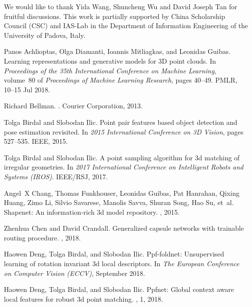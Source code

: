 \documentclass[10pt,twocolumn,letterpaper]{article}
\theoremstyle{break}
\begin{document}
We would like to thank Yida Wang, Shuncheng Wu and David Joseph Tan for fruitful discussions. This work is partially supported by China Scholarship Council (CSC) and IAS-Lab in the Department of Information Engineering of the University of Padova, Italy. {\small
\begin{thebibliography}{10}\itemsep=-1pt

Panos Achlioptas, Olga Diamanti, Ioannis Mitliagkas, and Leonidas Guibas.
\newblock Learning representations and generative models for 3{D} point clouds.
\newblock In {\em Proceedings of the 35th International Conference on Machine
  Learning}, volume~80 of {\em Proceedings of Machine Learning Research}, pages
  40--49. PMLR, 10--15 Jul 2018.

Richard Bellman.
.
\newblock Courier Corporation, 2013.

Tolga Birdal and Slobodan Ilic.
\newblock Point pair features based object detection and pose estimation
  revisited.
\newblock In {\em 2015 International Conference on 3D Vision}, pages 527--535.
  IEEE, 2015.

Tolga Birdal and Slobodan Ilic.
\newblock A point sampling algorithm for 3d matching of irregular geometries.
\newblock In {\em 2017 International Conference on Intelligent Robots and
  Systems (IROS)}. IEEE/RSJ, 2017.

Angel~X Chang, Thomas Funkhouser, Leonidas Guibas, Pat Hanrahan, Qixing Huang,
  Zimo Li, Silvio Savarese, Manolis Savva, Shuran Song, Hao Su, et~al.
\newblock Shapenet: An information-rich 3d model repository.
, 2015.

Zhenhua Chen and David Crandall.
\newblock Generalized capsule networks with trainable routing procedure.
, 2018.

Haowen Deng, Tolga Birdal, and Slobodan Ilic.
\newblock Ppf-foldnet: Unsupervised learning of rotation invariant 3d local
  descriptors.
\newblock In {\em The European Conference on Computer Vision (ECCV)}, September
  2018.

Haowen Deng, Tolga Birdal, and Slobodan Ilic.
\newblock Ppfnet: Global context aware local features for robust 3d point
  matching.
, 1, 2018.


\end{thebibliography}}
\end{document}
